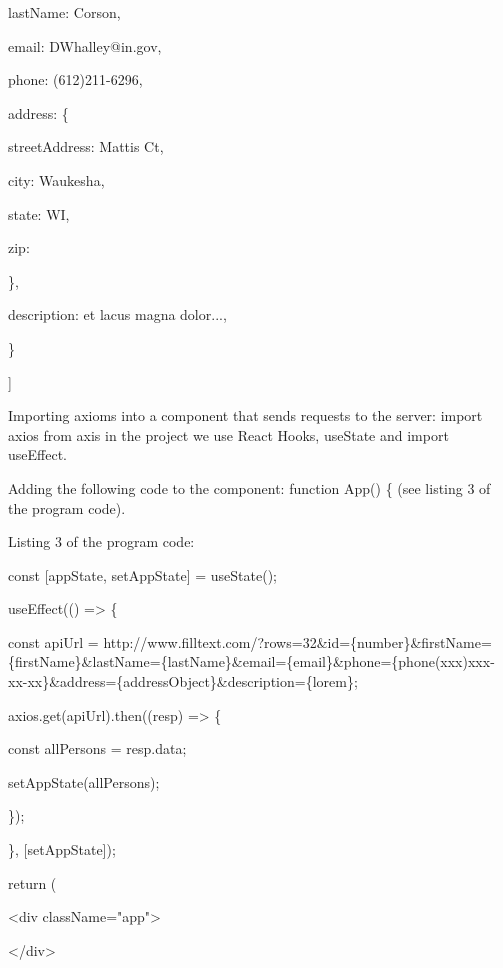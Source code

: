 lastName: \textquotesingle Corson\textquotesingle,

email: \textquotesingle DWhalley@in.gov\textquotesingle,

phone: \textquotesingle(612)211-6296\textquotesingle,

address: \{

streetAddress:  Mattis Ct\textquotesingle,

city: \textquotesingle Waukesha\textquotesingle,

state: \textquotesingle WI\textquotesingle,

zip: \textquotesingle{}

\},

description: \textquotesingle et lacus magna dolor...\textquotesingle,

\}

{]}

\begin{multicols}{2}


Importing axioms into a component that sends requests to the server:
import axios from \textquotesingle axis\textquotesingle{} in the project
we use React Hooks, useState and import useEffect.

Adding the following code to the component: function App() \{ (see
listing 3 of the program code).

Listing 3 of the program code:
\end{multicols}



const {[}appState, setAppState{]} = useState();

useEffect(() =\textgreater{} \{

const apiUrl =
\textquotesingle http://www.filltext.com/?rows=32\&id=\{number\}\&firstName=\{firstName\}\&lastName=\{lastName\}\&email=\{email\}\&phone=\{phone\textbar(xxx)xxx-xx-xx\}\&address=\{addressObject\}\&description=\{lorem\}\textquotesingle;

axios.get(apiUrl).then((resp) =\textgreater{} \{

const allPersons = resp.data;

setAppState(allPersons);

\});

\}, {[}setAppState{]});

return (

\textless div className="app"\textgreater{}

\textless/div\textgreater{}

